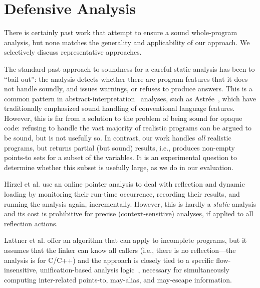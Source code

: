 \section{Defensive Analysis}
\label{sec:related:defensive}

There is certainly past work that attempt to ensure a sound whole-program analysis, but none matches the generality and applicability of our approach. We selectively discuss representative approaches.

The standard past approach to soundness for a careful static analysis has been to ``bail out'': the analysis detects whether there are program features that it does not handle soundly, and issues warnings, or refuses to produce answers. This is a common pattern in abstract-interpretation~\cite{popl:1977:Cousot} analyses, such as Astr\'{e}e~\cite{sas:2007:Delmas}, which have traditionally emphasized sound handling of conventional language features. However, this is far from a solution to the problem of being sound for opaque code: refusing to handle the vast majority of realistic programs can be argued to be sound, but is not usefully so. In contrast, our work handles \emph{all} realistic programs, but returns partial (but sound) results, i.e., produces non-empty points-to sets for a subset of the variables. It is an experimental question to determine whether this subset is usefully large, as we do in our evaluation.

Hirzel et al. \cite{ecoop:2004:Hirzel,article:2007:Hirzel} use an online pointer analysis to deal with reflection and dynamic loading by monitoring their run-time occurrence, recording their results, and running the analysis again, incrementally. However, this is hardly a \emph{static} analysis and its cost is prohibitive for precise (context-sensitive) analyses, if applied to all reflection actions.

Lattner et al. \cite{pldi:2007:Lattner} offer an algorithm that can apply to incomplete programs, but it assumes that the linker can know all callers (i.e., there is no reflection---the analysis is for C/C++) and the approach is closely tied to a specific flow-insensitive, unification-based analysis logic~\cite{popl:1996:Steensgaard}, necessary for simultaneously computing inter-related points-to, may-alias, and may-escape information.

